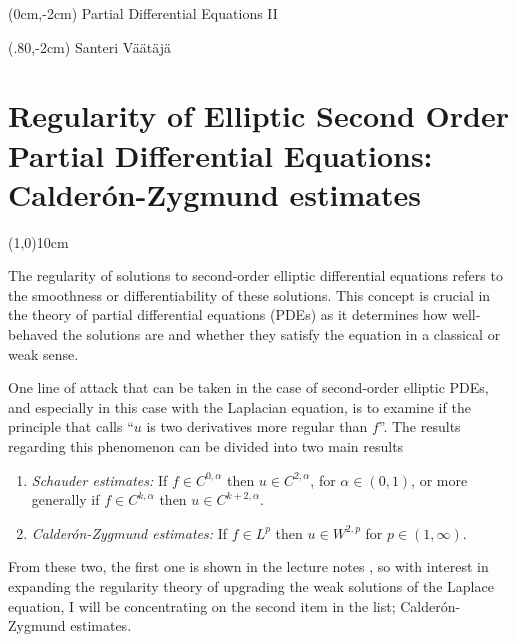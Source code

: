 \documentclass[12pt]{artikel1}
\begin{document}
\begin{textblock*}{250mm}(0cm,-2cm)
\noindent Partial Differential Equations \RN{2}
\end{textblock*}
\begin{textblock*}{250mm}(.80\textwidth,-2cm)
\noindent Santeri Väätäjä %
\end{textblock*}
\vspace*{-2cm}
\section*{Regularity of Elliptic Second Order Partial Differential Equations: Calder\'{o}n-Zygmund estimates}
\vspace*{-.5cm}
\line(1,0){10cm}
\vspace*{.5cm}

\noindent The regularity of solutions to second-order elliptic differential equations refers to the smoothness or differentiability of these solutions. This concept is crucial in the theory of partial differential equations (PDEs) as it determines how well-behaved the solutions are and whether they satisfy the equation in a classical or weak sense.

One line of attack that can be taken in the case of second-order elliptic PDEs, and especially in this case with the Laplacian equation, is to examine if the principle that \cite{Fern_ndez_Real_2022} calls ``$u$ is two derivatives more regular than $f$''. The results regarding this phenomenon can be divided into two main results

\begin{enumerate}
    \item \textit{Schauder estimates:} If $f\in C^{0,\alpha}$ then $u\in C^{2,\alpha}$, for $\alpha\in(0,1)$, or more generally if $f\in C^{k,\alpha}$ then $u\in C^{k+2,\alpha}$.
    \item \textit{Calder\'{o}n-Zygmund estimates:} If $f\in L^p$ then $u\in W^{2,p}$ for $p\in(1,\infty)$.
\end{enumerate}

\noindent From these two, the first one is shown in the lecture notes \cite{covi}, so with interest in expanding the regularity theory of upgrading the weak solutions of the Laplace equation, I will be concentrating on the second item in the list; Calder\'{o}n-Zygmund estimates.
\end{document}
